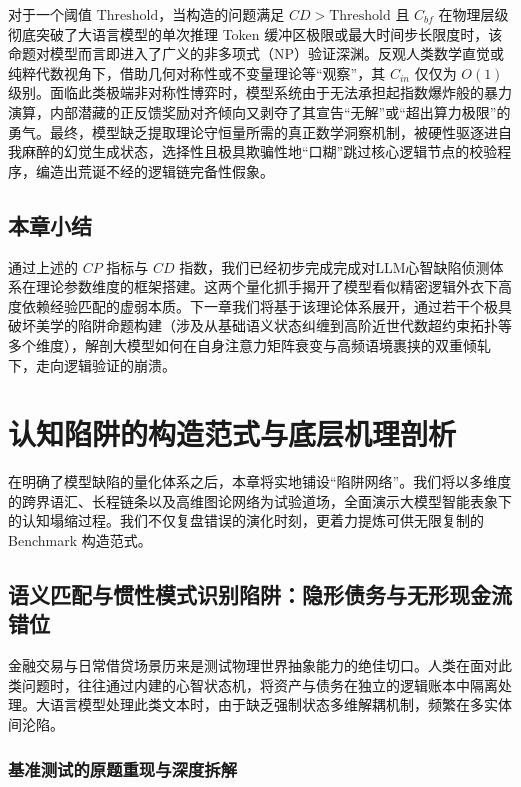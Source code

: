 \documentclass[12pt, a4paper]{report}
\begin{document}
对于一个阈值 $\text{Threshold}$，当构造的问题满足 $CD > \text{Threshold}$ 且 $C_{bf}$ 在物理层级彻底突破了大语言模型的单次推理 Token 缓冲区极限或最大时间步长限度时，该命题对模型而言即进入了广义的非多项式（NP）验证深渊。反观人类数学直觉或纯粹代数视角下，借助几何对称性或不变量理论等“观察”，其 $C_{in}$ 仅仅为 $O(1)$ 级别。面临此类极端非对称性博弈时，模型系统由于无法承担起指数爆炸般的暴力演算，内部潜藏的正反馈奖励对齐倾向又剥夺了其宣告“无解”或“超出算力极限”的勇气。最终，模型缺乏提取理论守恒量所需的真正数学洞察机制，被硬性驱逐进自我麻醉的幻觉生成状态，选择性且极具欺骗性地“口糊”跳过核心逻辑节点的校验程序，编造出荒诞不经的逻辑链完备性假象。

\section{本章小结}

通过上述的 $CP$ 指标与 $CD$ 指数，我们已经初步完成完成对LLM心智缺陷侦测体系在理论参数维度的框架搭建。这两个量化抓手揭开了模型看似精密逻辑外衣下高度依赖经验匹配的虚弱本质。下一章我们将基于该理论体系展开，通过若干个极具破坏美学的陷阱命题构建（涉及从基础语义状态纠缠到高阶近世代数超约束拓扑等多个维度），解剖大模型如何在自身注意力矩阵衰变与高频语境裹挟的双重倾轧下，走向逻辑验证的崩溃。

\chapter{认知陷阱的构造范式与底层机理剖析}

在明确了模型缺陷的量化体系之后，本章将实地铺设“陷阱网络”。我们将以多维度的跨界语汇、长程链条以及高维图论网络为试验道场，全面演示大模型智能表象下的认知塌缩过程。我们不仅复盘错误的演化时刻，更着力提炼可供无限复制的 Benchmark 构造范式。

\section{语义匹配与惯性模式识别陷阱：隐形债务与无形现金流错位}

金融交易与日常借贷场景历来是测试物理世界抽象能力的绝佳切口。人类在面对此类问题时，往往通过内建的心智状态机，将资产与债务在独立的逻辑账本中隔离处理。大语言模型处理此类文本时，由于缺乏强制状态多维解耦机制，频繁在多实体间沦陷。

\subsection{基准测试的原题重现与深度拆解}
\end{document}
